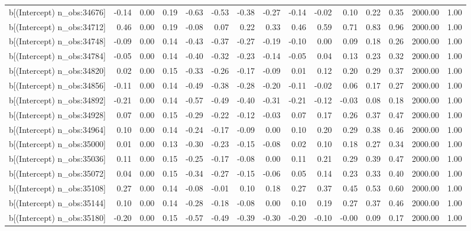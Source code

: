 \begin{table}[ht]
\begin{tabular}{rrrrrrrrrrrrrrr}
  b[(Intercept) n\_obs:34676] & -0.14 & 0.00 & 0.19 & -0.63 & -0.53 & -0.38 & -0.27 & -0.14 & -0.02 & 0.10 & 0.22 & 0.35 & 2000.00 & 1.00 \\ 
  b[(Intercept) n\_obs:34712] & 0.46 & 0.00 & 0.19 & -0.08 & 0.07 & 0.22 & 0.33 & 0.46 & 0.59 & 0.71 & 0.83 & 0.96 & 2000.00 & 1.00 \\ 
  b[(Intercept) n\_obs:34748] & -0.09 & 0.00 & 0.14 & -0.43 & -0.37 & -0.27 & -0.19 & -0.10 & 0.00 & 0.09 & 0.18 & 0.26 & 2000.00 & 1.00 \\ 
  b[(Intercept) n\_obs:34784] & -0.05 & 0.00 & 0.14 & -0.40 & -0.32 & -0.23 & -0.14 & -0.05 & 0.04 & 0.13 & 0.23 & 0.32 & 2000.00 & 1.00 \\ 
  b[(Intercept) n\_obs:34820] & 0.02 & 0.00 & 0.15 & -0.33 & -0.26 & -0.17 & -0.09 & 0.01 & 0.12 & 0.20 & 0.29 & 0.37 & 2000.00 & 1.00 \\ 
  b[(Intercept) n\_obs:34856] & -0.11 & 0.00 & 0.14 & -0.49 & -0.38 & -0.28 & -0.20 & -0.11 & -0.02 & 0.06 & 0.17 & 0.27 & 2000.00 & 1.00 \\ 
  b[(Intercept) n\_obs:34892] & -0.21 & 0.00 & 0.14 & -0.57 & -0.49 & -0.40 & -0.31 & -0.21 & -0.12 & -0.03 & 0.08 & 0.18 & 2000.00 & 1.00 \\ 
  b[(Intercept) n\_obs:34928] & 0.07 & 0.00 & 0.15 & -0.29 & -0.22 & -0.12 & -0.03 & 0.07 & 0.17 & 0.26 & 0.37 & 0.47 & 2000.00 & 1.00 \\ 
  b[(Intercept) n\_obs:34964] & 0.10 & 0.00 & 0.14 & -0.24 & -0.17 & -0.09 & 0.00 & 0.10 & 0.20 & 0.29 & 0.38 & 0.46 & 2000.00 & 1.00 \\ 
  b[(Intercept) n\_obs:35000] & 0.01 & 0.00 & 0.13 & -0.30 & -0.23 & -0.15 & -0.08 & 0.02 & 0.10 & 0.18 & 0.27 & 0.34 & 2000.00 & 1.00 \\ 
  b[(Intercept) n\_obs:35036] & 0.11 & 0.00 & 0.15 & -0.25 & -0.17 & -0.08 & 0.00 & 0.11 & 0.21 & 0.29 & 0.39 & 0.47 & 2000.00 & 1.00 \\ 
  b[(Intercept) n\_obs:35072] & 0.04 & 0.00 & 0.15 & -0.34 & -0.27 & -0.15 & -0.06 & 0.05 & 0.14 & 0.23 & 0.33 & 0.40 & 2000.00 & 1.00 \\ 
  b[(Intercept) n\_obs:35108] & 0.27 & 0.00 & 0.14 & -0.08 & -0.01 & 0.10 & 0.18 & 0.27 & 0.37 & 0.45 & 0.53 & 0.60 & 2000.00 & 1.00 \\ 
  b[(Intercept) n\_obs:35144] & 0.10 & 0.00 & 0.14 & -0.28 & -0.18 & -0.08 & 0.00 & 0.10 & 0.19 & 0.27 & 0.37 & 0.46 & 2000.00 & 1.00 \\ 
  b[(Intercept) n\_obs:35180] & -0.20 & 0.00 & 0.15 & -0.57 & -0.49 & -0.39 & -0.30 & -0.20 & -0.10 & -0.00 & 0.09 & 0.17 & 2000.00 & 1.00 \\ 

\end{tabular}
\end{table}
